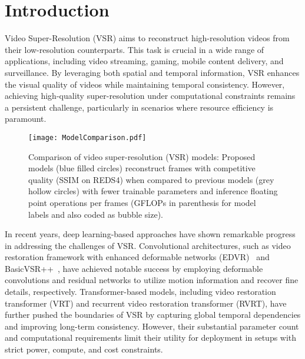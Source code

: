 \section{Introduction}
\label{sec:intro}

Video Super-Resolution (VSR) aims to reconstruct high-resolution videos from their low-resolution counterparts. This task is crucial in a wide range of applications, including video streaming, gaming, mobile content delivery, and surveillance. By leveraging both spatial and temporal information, VSR enhances the visual quality of videos while maintaining temporal consistency. However, achieving high-quality super-resolution under computational constraints remains a persistent challenge, particularly in scenarios where resource efficiency is paramount.



   
\begin{figure}[h]
    \centering
    \texttt{[image: ModelComparison.pdf]}
    \caption{Comparison of video super-resolution (VSR) models: Proposed models (blue filled circles) reconstruct frames with competitive quality (SSIM on REDS4) when compared to previous models (grey hollow circles) with fewer trainable parameters and inference floating point operations per frames (GFLOPs in parenthesis for model labels and also coded as bubble size).}
    \label{fig:model_comparison}
\end{figure}

In recent years, deep learning-based approaches have shown remarkable progress in addressing the challenges of VSR. Convolutional architectures, such as video restoration framework with enhanced deformable networks (EDVR)~\cite{wang2019edvr} and BasicVSR++~\cite{chan2022basicvsr++}, have achieved notable success by employing deformable convolutions and residual networks to utilize motion information and recover fine details, respectively. Transformer-based models, including video restoration transformer (VRT) and recurrent video restoration transformer (RVRT), have further pushed the boundaries of VSR by capturing global temporal dependencies and improving long-term consistency\cite{liang2022vrt}\cite{liang2022rvrt}. However, their substantial parameter count and computational requirements limit their utility for deployment in setups with strict power, compute, and cost constraints.

